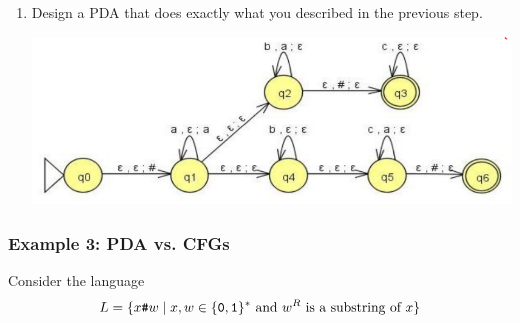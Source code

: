 \documentclass[letterpaper]{article}
\begin{document}
\begin{enumerate}
    \item Design a PDA that does exactly what you described in the previous step. 
    \begin{mdframed}[nobreak=true]
        \begin{center}
            \includegraphics[scale=0.6]{assets/pda_2.png}
        \end{center}
    \end{mdframed}
\end{enumerate}


\subsubsection{Example 3: PDA vs. CFGs}
Consider the language 
\[L = \{x\texttt{\#}w \mid x, w \in \{\texttt{0}, \texttt{1}\}^* \text{ and } w^R \text{ is a substring of } x\}\]
\end{document}
